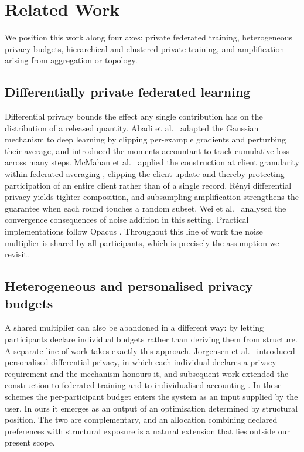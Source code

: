\documentclass[acmsmall,screen,review,anonymous]{acmart}
\theoremstyle{acmdefinition}%
\begin{document}
\section{Related Work}
\label{sec:related}

We position this work along four axes: private federated training, heterogeneous
privacy budgets, hierarchical and clustered private training, and amplification
arising from aggregation or topology.

\subsection{Differentially private federated learning}

Differential privacy \cite{dwork2006calibrating} bounds the effect any single
contribution has on the distribution of a released quantity. Abadi et
al.~\cite{abadi2016dpsgd} adapted the Gaussian mechanism to deep learning by
clipping per-example gradients and perturbing their average, and introduced the
moments accountant to track cumulative loss across many steps. McMahan et
al.~\cite{mcmahan2018dprnn} applied the construction at client granularity within
federated averaging \cite{mcmahan2017fedavg}, clipping the client update and
thereby protecting participation of an entire client rather than of a single
record. R\'enyi differential privacy \cite{mironov2017rdp} yields tighter
composition, and subsampling amplification \cite{wang2019subsampled} strengthens
the guarantee when each round touches a random subset. Wei et
al.~\cite{wei2020nbafl} analysed the convergence consequences of noise addition in
this setting. Practical implementations follow Opacus
\cite{yousefpour2021opacus}. Throughout this line of work the noise multiplier is
shared by all participants, which is precisely the assumption we revisit.

\subsection{Heterogeneous and personalised privacy budgets}

A shared multiplier can also be abandoned in a different way: by letting participants
declare individual budgets rather than deriving them from structure. A separate line of
work takes exactly this approach. Jorgensen et
al.~\cite{jorgensen2015personalized} introduced personalised differential privacy,
in which each individual declares a privacy requirement and the mechanism honours
it, and subsequent work extended the construction to federated training and to
individualised accounting \cite{boenisch2023individualized}. In these schemes the
per-participant budget enters the system as an input supplied by the user. In ours
it emerges as an output of an optimisation determined by structural position. The
two are complementary, and an allocation combining declared preferences with
structural exposure is a natural extension that lies outside our present scope.
\end{document}
